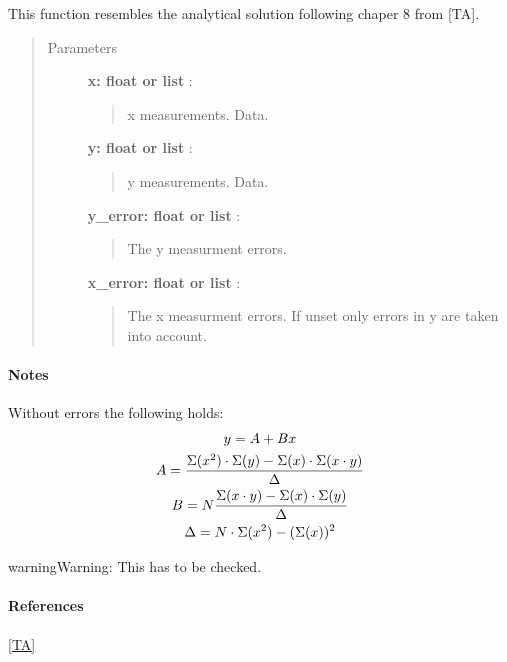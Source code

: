 \documentclass[a4paper,10pt,english]{sphinxmanual}
\begin{document}
\begin{fulllineitems}
\label{functions:astrolyze.functions.astro_functions.analytic_linear_fit}
This function resembles the analytical solution following chaper 8 from
{[}TA{]}.
\begin{quote}\begin{description}
\item[{Parameters }] \leavevmode
\textbf{x: float or list} :
\begin{quote}

x measurements. Data.
\end{quote}

\textbf{y: float or list} :
\begin{quote}

y measurements. Data.
\end{quote}

\textbf{y\_error: float or list} :
\begin{quote}

The y measurment errors.
\end{quote}

\textbf{x\_error: float or list} :
\begin{quote}

The x measurment errors. If unset only errors in y are taken into
account.
\end{quote}

\end{description}\end{quote}
\paragraph{Notes}

Without errors the following holds:
\begin{gather}
\begin{split}y = A + B x\end{split}\notag\\\begin{split}A = \frac{\Sigma(x^2) \cdot \Sigma(y) - \Sigma(x) \cdot
\Sigma(x \cdot y)}{\Delta}\end{split}\notag\\\begin{split}B = N \frac{\Sigma(x \cdot y) - \Sigma (x) \cdot \Sigma(y)}{\Delta}\end{split}\notag\\\begin{split}\Delta = N \cdot \Sigma(x^2) - (\Sigma(x))^2\end{split}\notag
\end{gather}
\begin{notice}{warning}{Warning:}
This has to be checked.
\end{notice}
\paragraph{References}

{\hyperref[functions:ta]{{[}TA{]}}}

\end{fulllineitems}
\end{document}
